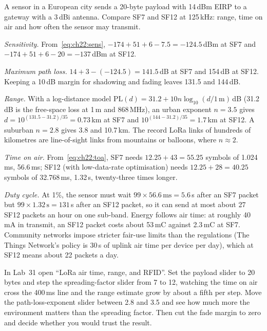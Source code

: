 \begin{worked}
A sensor in a European city sends a 20-byte payload with 14\,dBm EIRP to a gateway with a 3\,dBi
antenna. Compare SF7 and SF12 at 125\,kHz: range, time on air and how often the sensor may transmit.

\emph{Sensitivity.} From~\eqref{eq:ch22:sens}, $-174+51+6-7.5=-124.5$\,dBm at SF7 and
$-174+51+6-20=-137$\,dBm at SF12.

\emph{Maximum path loss.} $14+3-(-124.5)=141.5$\,dB at SF7 and 154\,dB at SF12. Keeping a 10\,dB margin
for shadowing and fading leaves 131.5 and 144\,dB.

\emph{Range.} With a log-distance model $\text{PL}(d)=31.2+10n\log_{10}(d/1\,\text{m})$\,dB (31.2\,dB is
the free-space loss at 1\,m and 868\,MHz), an urban exponent $n=3.5$ gives
$d=10^{(131.5-31.2)/35}=0.73$\,km at SF7 and $10^{(144-31.2)/35}=1.7$\,km at SF12. A suburban $n=2.8$
gives 3.8 and 10.7\,km. The record LoRa links of hundreds of kilometres are line-of-sight links from
mountains or balloons, where $n\approx2$.

\emph{Time on air.} From~\eqref{eq:ch22:toa}, SF7 needs $12.25+43=55.25$ symbols of 1.024\,ms,
56.6\,ms; SF12 (with low-data-rate optimisation) needs $12.25+28=40.25$ symbols of 32.768\,ms,
1.32\,s, twenty-three times longer.

\emph{Duty cycle.} At 1\%, the sensor must wait $99\times56.6\,\text{ms}=5.6$\,s after an SF7 packet but
$99\times1.32\,\text{s}=131$\,s after an SF12 packet, so it can send at most about 27 SF12 packets an
hour on one sub-band. Energy follows air time: at roughly 40\,mA in transmit, an SF12 packet costs
about 53\,mC against 2.3\,mC at SF7. Community networks impose stricter fair-use limits than the
regulations (The Things Network's policy is 30\,s of uplink air time per device per day), which at
SF12 means about 22 packets a day.
\end{worked}

\begin{tryit}
In Lab~31 open ``LoRa air time, range, and RFID''. Set the payload slider to 20 bytes and step the
spreading-factor slider from 7 to 12, watching the time on air cross the 400\,ms line and the range
estimate grow by about a fifth per step. Move the path-loss-exponent slider between 2.8 and 3.5 and
see how much more the environment matters than the spreading factor. Then cut the fade margin to
zero and decide whether you would trust the result.
\end{tryit}


